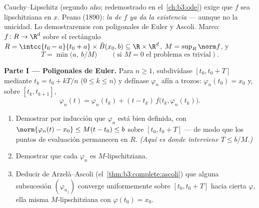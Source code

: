 \begin{problem}[{Problema de fin de semana --- existencia de soluciones
de
$x' = f(t, x)$ sin hipótesis de Lipschitz}]\label{pb:b3:complete:1}
Cauchy--Lipschitz (segundo año; redemostrado en el~\cref{ch:b3:ode})
exige que $f$ sea lipschitziana en $x$. Peano (1890): \emph{la
 de $f$ ya da la
existencia} --- aunque no la unicidad. Lo demostraremos con poligonales
de Euler y Ascoli. Marco: $f \colon R
\to \R^d$  sobre el
rectángulo $R = \intcc{t_0 - a}{t_0
+ a}\times \bar B(x_0, b) \subseteq \R\times\R^d$, $M =
\sup_R\norm f$, y
\[
T = \min\bigl(a,\ b/M\bigr)
\qquad (\text{si } M = 0 \text{ el problema es trivial}).
\]

\medskip
\noindent\textbf{Parte I --- Poligonales de Euler.} Para $n \geq 1$,
subdivídase $[t_0, t_0 + T]$ mediante $t_k = t_0 + kT/n$ ($0 \leq k
\leq n$) y defínase $\varphi_n$ afín a trozos: $\varphi_n(t_0) = x_0$ y,
sobre $[t_k, t_{k+1}]$,
\[
\varphi_n(t) = \varphi_n(t_k) + (t -
t_k)\,f\bigl(t_k, \varphi_n(t_k)\bigr).
\]
\begin{enumerate}
  \item Demostrar por inducción que $\varphi_n$ está bien definida, con
  $\norm{\varphi_n(t) - x_0} \leq M(t - t_0) \leq b$ sobre
  $[t_0, t_0 + T]$ --- de modo que los puntos de evaluación permanecen
  en $R$. \emph{(Aquí es donde interviene $T \leq b/M$.)} \item
  Demostrar que cada $\varphi_n$ es $M$-lipschitziana. \item Deducir de
  Arzelà--Ascoli (el~\cref{thm:b3:complete:ascoli}) que alguna
  subsucesión $(\varphi_{n_j})$ converge uniformemente sobre
  $[t_0, t_0 +
        T]$ hacia cierta $\varphi$, ella misma $M$-lipschitziana con
        $\varphi(t_0) = x_0$.
\end{enumerate}


\end{problem}
